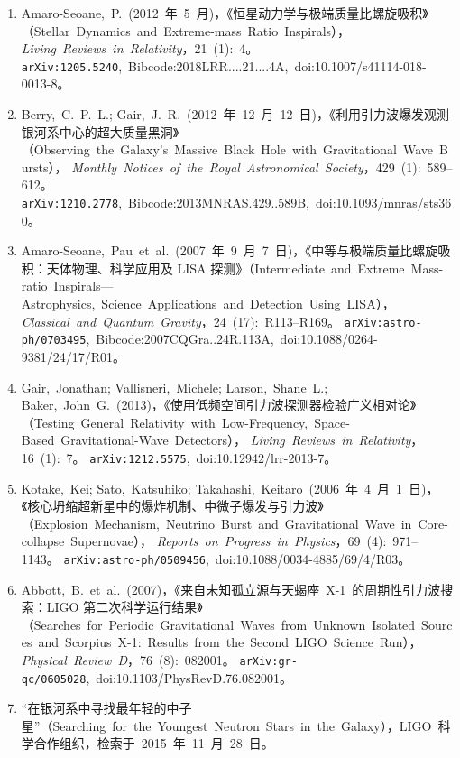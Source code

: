 \begin{enumerate}
        \textit{Classical~and~Quantum~Gravity}，29~(12):~124016。%
        \texttt{arXiv:1202.0839},~Bibcode:2012CQGra..29l4016A,~doi:10.1088/0264-9381/29/12/124016。
  \item Amaro-Seoane,~P.~(2012~年~5~月)，《恒星动力学与极端质量比螺旋吸积》（Stellar~Dynamics~and~Extreme-mass~Ratio~Inspirals），%
        \textit{Living~Reviews~in~Relativity}，21~(1):~4。%
        \texttt{arXiv:1205.5240},~Bibcode:2018LRR....21....4A,~doi:10.1007/s41114-018-0013-8。
  \item Berry,~C.~P.~L.; Gair,~J.~R.~(2012~年~12~月~12~日)，《利用引力波爆发观测银河系中心的超大质量黑洞》（Observing~the~Galaxy’s~Massive~Black~Hole~with~Gravitational~Wave~Bursts），%
        \textit{Monthly~Notices~of~the~Royal~Astronomical~Society}，429~(1):~589–612。%
        \texttt{arXiv:1210.2778},~Bibcode:2013MNRAS.429..589B,~doi:10.1093/mnras/sts360。
  \item Amaro-Seoane,~Pau~et~al.~(2007~年~9~月~7~日)，《中等与极端质量比螺旋吸积：天体物理、科学应用及 LISA 探测》（Intermediate~and~Extreme~Mass-ratio~Inspirals—Astrophysics,~Science~Applications~and~Detection~Using~LISA），%
        \textit{Classical~and~Quantum~Gravity}，24~(17):~R113–R169。%
        \texttt{arXiv:astro-ph/0703495},~Bibcode:2007CQGra..24R.113A,~doi:10.1088/0264-9381/24/17/R01。
  \item Gair,~Jonathan; Vallisneri,~Michele; Larson,~Shane~L.; Baker,~John~G.~(2013)，《使用低频空间引力波探测器检验广义相对论》（Testing~General~Relativity~with~Low-Frequency,~Space-Based~Gravitational-Wave~Detectors），%
        \textit{Living~Reviews~in~Relativity}，16~(1):~7。%
        \texttt{arXiv:1212.5575},~doi:10.12942/lrr-2013-7。
  \item Kotake,~Kei; Sato,~Katsuhiko; Takahashi,~Keitaro~(2006~年~4~月~1~日)，《核心坍缩超新星中的爆炸机制、中微子爆发与引力波》（Explosion~Mechanism,~Neutrino~Burst~and~Gravitational~Wave~in~Core-collapse~Supernovae），%
        \textit{Reports~on~Progress~in~Physics}，69~(4):~971–1143。%
        \texttt{arXiv:astro-ph/0509456},~doi:10.1088/0034-4885/69/4/R03。
  \item Abbott,~B.~et~al.~(2007)，《来自未知孤立源与天蝎座~X-1~的周期性引力波搜索：LIGO 第二次科学运行结果》（Searches~for~Periodic~Gravitational~Waves~from~Unknown~Isolated~Sources~and~Scorpius~X-1:~Results~from~the~Second~LIGO~Science~Run），%
        \textit{Physical~Review~D}，76~(8):~082001。%
        \texttt{arXiv:gr-qc/0605028},~doi:10.1103/PhysRevD.76.082001。
  \item “在银河系中寻找最年轻的中子星”（Searching~for~the~Youngest~Neutron~Stars~in~the~Galaxy），LIGO~科学合作组织，检索于~2015~年~11~月~28~日。

\end{enumerate}
